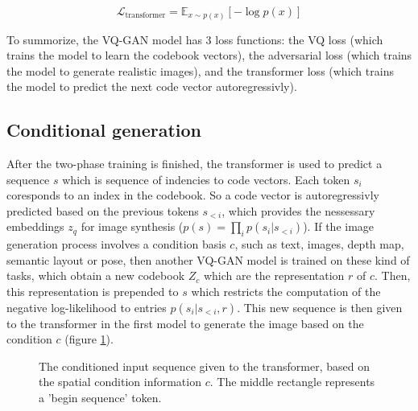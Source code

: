 \begin{equation}
    \mathcal{L}_{\text{transformer}} = \mathbb{E}_{x \sim p(x)} [- \log p(x)]
\end{equation}

To summorize, the VQ-GAN model has 3 loss functions: the VQ loss (which trains the model to learn the codebook vectors), the adversarial loss (which trains the model to generate realistic images), and the transformer loss (which trains the model to predict the next code vector autoregressivly).







\subsection{Conditional generation}

After the two-phase training is finished, the transformer is used to predict a sequence $s$ which is sequence of indencies to code vectors. Each token $s_i$ coresponds to an index in the codebook. So a code vector is autoregressivly predicted based on the previous tokens $s_{<i}$, which provides the nessessary embeddings $z_q$ for image synthesis ($p(s) = \prod_{i} p(s_i | s_{<i})$). If the image generation process involves a condition basis $c$, such as text, images, depth map, semantic layout or pose, then another VQ-GAN model is trained on these kind of tasks, which obtain a new codebook $Z_c$ which are the representation $r$ of $c$. Then, this representation is prepended to $s$ which restricts the computation of the negative log-likelihood to entries $p(s_i | s_{<i}, r)$. This new sequence is then given to the transformer in the first model to generate the image based on the condition $c$ (figure \ref{fig:vqgan_conditional_generation}).

\begin{figure}
    \centering
    \label{fig:vqgan_conditional_generation}
    \caption{The conditioned input sequence given to the transformer, based on the spatial condition information $c$. The middle rectangle represents a 'begin sequence' token.}
\end{figure}






